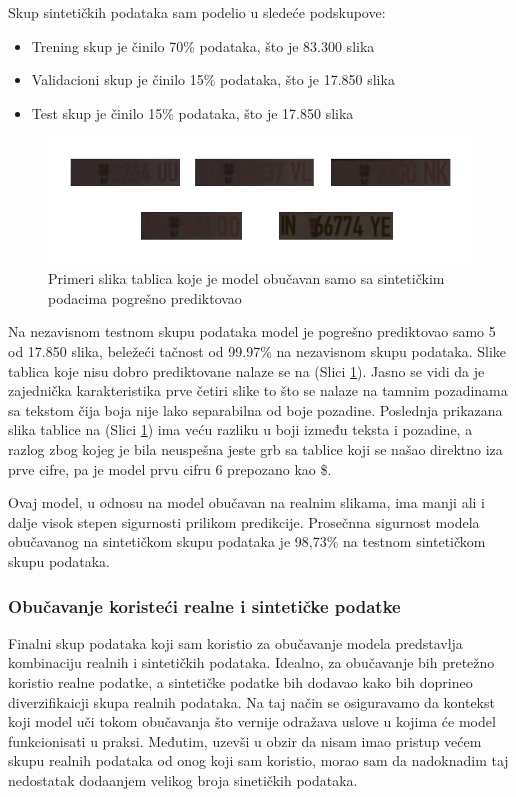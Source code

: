 \documentclass[a4paper,12pt]{article}
\begin{document}
	Skup sintetičkih podataka sam podelio u sledeće podskupove:
	\begin{itemize}
		\item Trening skup je činilo 70\% podataka, što je 83.300 slika
		\item Validacioni skup je činilo 15\% podataka, što je 17.850 slika
		\item Test skup je činilo 15\% podataka, što je 17.850 slika
	\end{itemize}
	
	\begin{figure}[H]
		\centering
		\includegraphics[width=\textwidth]{assets/bad-predictions-synthetic-data-model.png}
		\caption{Primeri slika tablica koje je model obučavan samo sa sintetičkim podacima pogrešno prediktovao}
		\label{fig:bad-predictions-synthetic-data-model}
	\end{figure}
	
	Na nezavisnom testnom skupu podataka model je pogrešno prediktovao samo 5 od 17.850 slika, beležeći tačnost od 99.97\% na nezavisnom skupu podataka. Slike tablica koje nisu dobro prediktovane nalaze se na (Slici \ref{fig:bad-predictions-synthetic-data-model}). Jasno se vidi da je zajednička karakteristika prve četiri slike to što se nalaze na tamnim pozadinama sa tekstom čija boja nije lako separabilna od boje pozadine. Poslednja prikazana slika tablice na (Slici \ref{fig:bad-predictions-synthetic-data-model}) ima veću razliku u boji između teksta i pozadine, a razlog zbog kojeg je bila neuspešna jeste grb sa tablice koji se našao direktno iza prve cifre, pa je model prvu cifru 6 prepozano kao \$.
	
	Ovaj model, u odnosu na model obučavan na realnim slikama, ima manji ali i dalje visok stepen sigurnosti prilikom predikcije. Prosečnna sigurnost modela obučavanog na sintetičkom skupu podataka je 98,73\% na testnom sintetičkom skupu podataka.
	
	\subsubsection{Obučavanje koristeći realne i sintetičke podatke}
	Finalni skup podataka koji sam koristio za obučavanje modela predstavlja kombinaciju realnih i sintetičkih podataka. Idealno, za obučavanje bih pretežno koristio realne podatke, a sintetičke podatke bih dodavao kako bih doprineo diverzifikaicji skupa realnih podataka. Na taj način se osiguravamo da kontekst koji model uči tokom obučavanja što vernije odražava uslove u kojima će model funkcionisati u praksi. Međutim, uzevši u obzir da nisam imao pristup većem skupu realnih podataka od onog koji sam koristio, morao sam da nadoknadim taj nedostatak dodaanjem velikog broja sinetičkih podataka.
	
\end{document}
